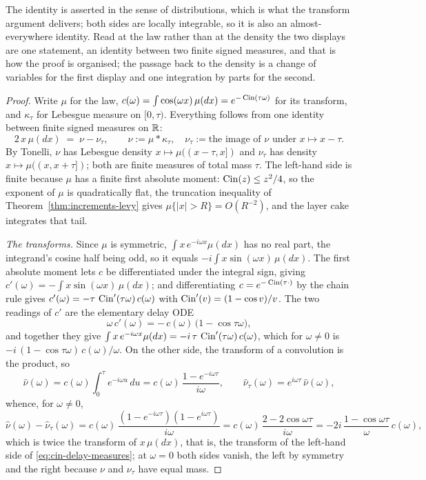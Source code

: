 The identity is asserted in the sense of distributions, which is what the transform argument
delivers; both sides are locally integrable, so it is also an almost-everywhere identity. Read
at the law rather than at the density the two displays are one statement, an identity between
two finite signed measures, and that is how the proof is organised; the passage back to the
density is a change of variables for the first display and one integration by parts for the
second.

\begin{proof}
Write $\mu$ for the law, $c(\omega) = \int\cos(\omega x)\,\mu(dx) = e^{-\operatorname{Cin}(\tau\omega)}$ for
its transform, and $\kappa_\tau$ for Lebesgue measure on $[0,\tau)$. Everything follows from one
identity between finite signed measures on $\mathbb{R}$:
\begin{equation}\label{eq:cin-delay-measures}
  2\,x\,\mu(dx) \;=\; \nu - \nu_\tau ,
  \qquad \nu := \mu * \kappa_\tau, \quad
  \nu_\tau := \text{the image of $\nu$ under } x \mapsto x - \tau .
\end{equation}
By Tonelli, $\nu$ has Lebesgue density $x \mapsto \mu((x-\tau,x])$ and $\nu_\tau$ has density
$x \mapsto \mu((x,x+\tau])$; both are finite measures of total mass $\tau$. The left-hand side
is finite because $\mu$ has a finite first absolute moment: $\operatorname{Cin}(z) \le z^2/4$, so the exponent
of $\mu$ is quadratically flat, the truncation inequality of
Theorem~\ref{thm:increments-levy} gives $\mu\{|x| > R\} = O(R^{-2})$, and the layer cake
integrates that tail.

\emph{The transforms.} Since $\mu$ is symmetric, $\int x\,e^{-i\omega x}\mu(dx)$ has no real
part, the integrand's cosine half being odd, so it equals $-i\int x\sin(\omega x)\,\mu(dx)$. The
first absolute moment lets $c$ be differentiated under the integral sign, giving
$c'(\omega) = -\int x\sin(\omega x)\,\mu(dx)$; and differentiating $c = e^{-\operatorname{Cin}(\tau\cdot)}$ by
the chain rule gives $c'(\omega) = -\tau\,\operatorname{Cin}'(\tau\omega)\,c(\omega)$ with
$\operatorname{Cin}'(v) = (1-\cos v)/v$. The two readings of $c'$ are the elementary delay ODE
\begin{equation}\label{eq:cin-delay-ode}
  \omega\,c'(\omega) = -\,c(\omega)\,\bigl(1 - \cos\tau\omega\bigr),
\end{equation}
and together they give
$\int x\,e^{-i\omega x}\mu(dx) = -i\,\tau\,\operatorname{Cin}'(\tau\omega)\,c(\omega)$, which for
$\omega \ne 0$ is $-i\,(1-\cos\tau\omega)\,c(\omega)/\omega$. On the other side, the transform of
a convolution is the product, so
\[
  \hat\nu(\omega) = c(\omega)\int_0^\tau e^{-i\omega u}\,du
    = c(\omega)\,\frac{1 - e^{-i\omega\tau}}{i\omega},
  \qquad \hat\nu_\tau(\omega) = e^{i\omega\tau}\,\hat\nu(\omega),
\]
whence, for $\omega \ne 0$,
\[
  \hat\nu(\omega) - \hat\nu_\tau(\omega)
    = c(\omega)\,\frac{(1 - e^{-i\omega\tau})(1 - e^{i\omega\tau})}{i\omega}
    = c(\omega)\,\frac{2 - 2\cos\omega\tau}{i\omega}
    = -2i\,\frac{1 - \cos\omega\tau}{\omega}\,c(\omega),
\]
which is twice the transform of $x\,\mu(dx)$, that is, the transform of the left-hand side of \ref{eq:cin-delay-measures}; at $\omega = 0$ both
sides vanish, the left by symmetry and the right because $\nu$ and $\nu_\tau$ have equal mass.


\end{proof}
